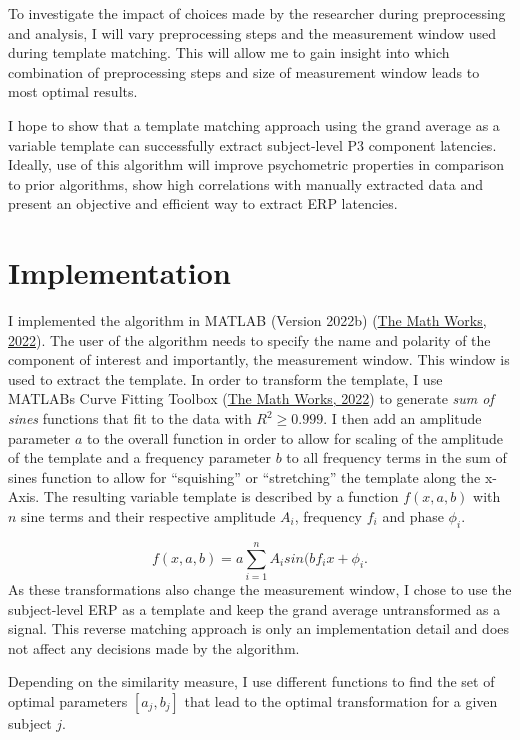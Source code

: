\documentclass[
  man]{apa7}
\begin{document}
To investigate the impact of choices made by the researcher during preprocessing and analysis, I will vary preprocessing steps and the measurement window used during template matching. This will allow me to gain insight into which combination of preprocessing steps and size of measurement window leads to most optimal results.

I hope to show that a template matching approach using the grand average as a variable template can successfully extract subject-level P3 component latencies. Ideally, use of this algorithm will improve psychometric properties in comparison to prior algorithms, show high correlations with manually extracted data and present an objective and efficient way to extract ERP latencies.

\hypertarget{implementation}{%
\section{Implementation}\label{implementation}}

I implemented the algorithm in MATLAB (Version 2022b) (\protect\hyperlink{ref-matlab2022b}{The Math Works, 2022}). The user of the algorithm needs to specify the name and polarity of the component of interest and importantly, the measurement window. This window is used to extract the template. In order to transform the template, I use MATLABs Curve Fitting Toolbox (\protect\hyperlink{ref-matlab2022b}{The Math Works, 2022}) to generate \emph{sum of sines} functions that fit to the data with \(R^2 \ge 0.999\). I then add an amplitude parameter \(a\) to the overall function in order to allow for scaling of the amplitude of the template and a frequency parameter \(b\) to all frequency terms in the sum of sines function to allow for ``squishing'' or ``stretching'' the template along the x-Axis. The resulting variable template is described by a function \(f(x, a, b)\) with \(n\) sine terms and their respective amplitude \(A_i\), frequency \(f_i\) and phase \(\phi_i\).

\[f(x, a, b) = a\sum_{i = 1}^{n} A_isin(bf_ix + \phi_i.\]
As these transformations also change the measurement window, I chose to use the subject-level ERP as a template and keep the grand average untransformed as a signal. This reverse matching approach is only an implementation detail and does not affect any decisions made by the algorithm.

Depending on the similarity measure, I use different functions to find the set of optimal parameters \([a_j, b_j]\) that lead to the optimal transformation for a given subject \(j\).
\end{document}
